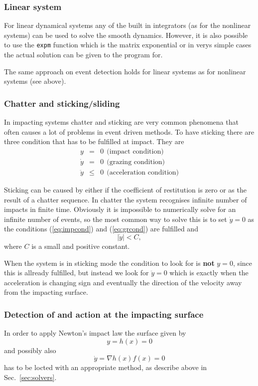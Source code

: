 \documentclass[10pt]{article}
\begin{document}
\subsubsection*{Linear system}
For linear dynamical systems any of the built in integrators (as for the nonlinear systems) can be used to solve the smooth dynamics. However, it is also possible to use the \verb|expm| function which is the matrix exponential or in verys simple cases the actual solution can be given to the program for. 

The same approach on event detection holds for linear systems as for nonlinear systems (see above).

\subsubsection*{Chatter and sticking/sliding}
In impacting systems chatter and sticking are very common phenomena that often causes a lot of problems in event driven methods. To have sticking there are three condition that has to be fulfilled at impact. They are
\begin{eqnarray}
y & = & 0 \ \ \text{(impact condition)} \label{eq:impcond}\\
\dot{y} & = & 0 \ \ \text{(grazing condition)} \label{eq:grcond}\\
\ddot{y} & \leq & 0 \ \ \text{(acceleration condition)} \label{eq:accond}
\end{eqnarray}

Sticking can be caused by either if the coefficient of restitution is zero or as the result of a chatter sequence. In chatter the system recognises infinite number of impacts in finite time. Obviously it is impossible to numerically solve for an infinite number of events, so the most common way to solve this is to set $\dot{y} = 0$ as the conditions (\ref{eq:impcond}) and (\ref{eq:grcond}) are fulfilled and
\begin{equation}
|\dot{y}| < C, \label{eq:C}
\end{equation}
where $C$ is a small and positive constant. 

When the system is in sticking mode the condition to look for is \textbf{not} $y = 0$, since this is allready fulfilled, but instead we look for $\ddot{y} = 0$ which is exactly when the acceleration is changing sign and eventually the direction of the velocity away from the impacting surface.

\subsubsection{Detection of and action at the impacting surface}
In order to apply Newton's impact law the surface given by
\begin{equation}
y = h(x) = 0
\end{equation}
and possibly also
\begin{equation}
\dot{y} = \nabla h(x)f(x) = 0
\end{equation}
has to be locted with an appropriate method, as describe above in Sec.~\ref{sec:solvers}.
\end{document}
